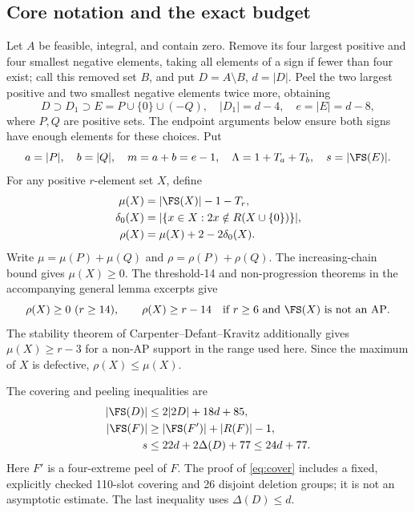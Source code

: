 \subsection{Core notation and the exact budget}\label{sec:budget}
Let $A$ be feasible, integral, and contain zero. Remove its four largest
positive and four smallest negative elements, taking all elements of a
sign if fewer than four exist; call this removed set $B$, and put
$D=A\setminus B$, $d=|D|$. Peel the two largest positive and two smallest
negative elements twice more, obtaining
\[
 D\supset D_1\supset E=P\cup\{0\}\cup(-Q),\quad
 |D_1|=d-4,\quad e=|E|=d-8,
\]
where $P,Q$ are positive sets. The endpoint arguments below ensure both
signs have enough elements for these choices. Put
\[
 a=|P|,\quad b=|Q|,\quad m=a+b=e-1,\quad
 \Lambda=1+T_a+T_b,\quad s=|\FS(E)|.
\]
For any positive $r$-element set $X$, define
\begin{align*}
 \mu(X)&=|\FS(X)|-1-T_r,\\
 \delta_0(X)&=|\{x\in X:2x\notin R(X\cup\{0\})\}|,\\
 \rho(X)&=\mu(X)+2-2\delta_0(X).
\end{align*}
Write $\mu=\mu(P)+\mu(Q)$ and $\rho=\rho(P)+\rho(Q)$.
The increasing-chain bound gives $\mu(X)\ge0$. The threshold-14
and non-progression theorems in the accompanying general lemma excerpts give
\begin{equation}\label{eq:input-rho}
 \rho(X)\ge0\ (r\ge14),\qquad
 \rho(X)\ge r-14\quad\hbox{if $r\ge6$ and $\FS(X)$ is not an AP}.
\end{equation}
The stability theorem of Carpenter--Defant--Kravitz \cite{CDK2026} additionally
gives $\mu(X)\ge r-3$ for a non-AP support in the range used here.
Since the maximum of $X$ is defective, $\rho(X)\le\mu(X)$.

The covering and peeling inequalities are
\begin{align}
 |\FS(D)|&\le2|2D|+18d+85,\label{eq:cover}\\
 |\FS(F)|&\ge|\FS(F')|+|R(F)|-1,\label{eq:peel}\\
 s&\le22d+2\Delta(D)+77\le24d+77.\label{eq:corebound}
\end{align}
Here $F'$ is a four-extreme peel of $F$. The proof of \eqref{eq:cover}
includes a fixed, explicitly checked 110-slot covering and 26 disjoint
deletion groups; it is not an asymptotic estimate. The last inequality
uses $\Delta(D)\le d$.

